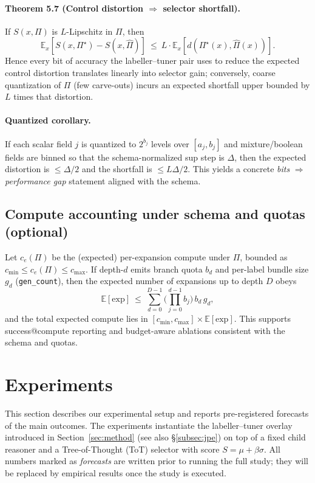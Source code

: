 \documentclass{article}
\theoremstyle{plain}
\theoremstyle{definition}
\theoremstyle{remark}
\begin{document}
\paragraph{Theorem 5.7 (Control distortion $\Rightarrow$ selector shortfall).}
If $S(x,\Pi)$ is $L$-Lipschitz in $\Pi$, then
\[
\mathbb{E}_x\!\left[S(x,\Pi^\star) - S(x,\widehat{\Pi})\right]\ \le\ L\cdot \mathbb{E}_x\!\left[d\!\left(\Pi^\star(x),\widehat{\Pi}(x)\right)\right].
\]
Hence every bit of accuracy the labeller--tuner pair uses to reduce the expected control distortion translates linearly into selector gain; conversely, coarse quantization of $\Pi$ (few carve-outs) incurs an expected shortfall upper bounded by $L$ times that distortion.

\paragraph{Quantized corollary.}
If each scalar field $j$ is quantized to $2^{b_j}$ levels over $[a_j,b_j]$ and mixture/boolean fields are binned so that the schema-normalized sup step is $\Delta$, then the expected distortion is $\le \Delta/2$ and the shortfall is $\le L\Delta/2$. 
This yields a concrete \emph{bits} $\Rightarrow$ \emph{performance gap} statement aligned with the schema.

\subsection{Compute accounting under schema and quotas (optional)}

Let $c_e(\Pi)$ be the (expected) per-expansion compute under $\Pi$, bounded as $c_{\min}\le c_e(\Pi)\le c_{\max}$. 
If depth-$d$ emits branch quota $b_d$ and per-label bundle size $g_d$ (\texttt{gen\_count}), then the expected number of expansions up to depth $D$ obeys
\[
\mathbb{E}[\text{exp}]\ \le\ \sum_{d=0}^{D-1}\Big(\prod_{j=0}^{d-1} b_j\Big)\, b_d\, g_d,
\]
and the total expected compute lies in $[c_{\min},c_{\max}]\times \mathbb{E}[\text{exp}]$. 
This supports success@compute reporting and budget-aware ablations consistent with the schema and quotas.


\section{Experiments}
\label{sec:experiments}

This section describes our experimental setup and reports pre-registered forecasts of the main outcomes. 
The experiments instantiate the labeller--tuner overlay introduced in Section~\ref{sec:method} (see also \S\ref{subsec:jpe}) on top of a fixed child reasoner and a Tree-of-Thought (ToT) selector with score $S=\mu+\beta\sigma$. 
All numbers marked as \emph{forecasts} are written prior to running the full study; they will be replaced by empirical results once the study is executed.
\end{document}
